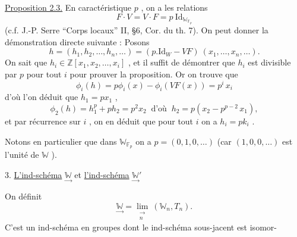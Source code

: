 \uline{Proposition 2.3.} En caractéristique $p$ , on a les relations
\[ F\cdot V = V\cdot F = p\ \mathrm{Id}_{\mathbb{W}_{\mathbb{F}_p}} \]
(c.f. J.-P. Serre ``Corps locaux'' II, §6, Cor. du th. 7). On peut donner
la démonstration directe suivante : Posons
\[ h = (h_1,h_2,\dots,h_n,\dots) = (p.\mathrm{Id}_W - VF)\ (x_1,\dots,x_n,\dots) . \]
On sait que $h_i \in \mathbb{Z}[x_1,x_2,\dots,x_i]$ , et il suffit de démontrer que $h_i$
est divisible par $p$ pour tout $i$ pour prouver la proposition. Or on
trouve que
\[ \phi_i(h) = p\phi_i(x) - \phi_i(VF(x)) = p^i\, x_i \]
d'où l'on déduit que $h_1 = px_1$ ,
\[ \phi_2(h) = h_1^p + ph_2 = p^2x_2 \ \text{ d'où }\ h_2 = p(x_2-p^{p-2}\, x_1) , \]
et par récurrence sur $i$ , on en déduit que pour tout $i$ on a $h_i = pk_i$ .

Notons en particulier que dans $\mathbb{W}_{\mathbb{F}_p}$ on a $p = (0,1,0,\dots)$
(car $(1,0,0,\dots)$ est l'unité de $\mathbb{W}$ ).

3. \uline{L'ind-schéma} $\underset{\rightarrow}{\mathbb{W}}$ et \uline{l'ind-schéma} $\underset{\rightarrow}{\mathbb{W}}'$

On définit
\[ \underset{\rightarrow}{\mathbb{W}} = \underset{\substack{\rightarrow\\ n}}{\lim}\ (\mathbb{W}_n,T_n) . \]
C'est un ind-schéma en groupes dont le ind-schéma sous-jacent est isomor-%

